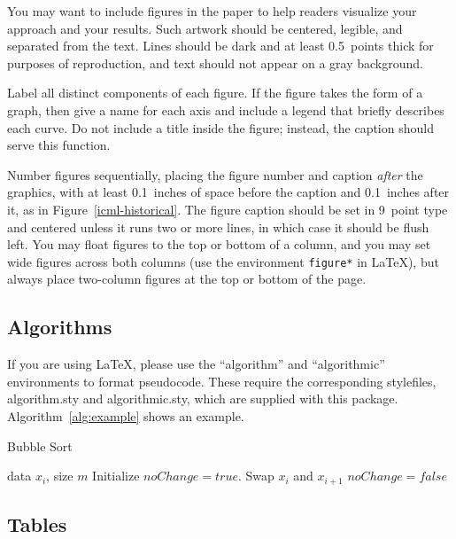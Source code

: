 \documentclass{article}
\begin{document}
You may want to include figures in the paper to help readers visualize
your approach and your results. Such artwork should be centered,
legible, and separated from the text. Lines should be dark and at
least 0.5~points thick for purposes of reproduction, and text should
not appear on a gray background.

Label all distinct components of each figure. If the figure takes the
form of a graph, then give a name for each axis and include a legend
that briefly describes each curve. Do not include a title inside the
figure; instead, the caption should serve this function.

Number figures sequentially, placing the figure number and caption
{\it after\/} the graphics, with at least 0.1~inches of space before
the caption and 0.1~inches after it, as in
Figure~\ref{icml-historical}.  The figure caption should be set in
9~point type and centered unless it runs two or more lines, in which
case it should be flush left.  You may float figures to the top or
bottom of a column, and you may set wide figures across both columns
(use the environment {\tt figure*} in \LaTeX), but always place
two-column figures at the top or bottom of the page.

\subsection{Algorithms}

If you are using \LaTeX, please use the ``algorithm'' and ``algorithmic'' 
environments to format pseudocode. These require 
the corresponding stylefiles, algorithm.sty and 
algorithmic.sty, which are supplied with this package. 
Algorithm~\ref{alg:example} shows an example. 

\begin{algorithm}[tb]
   \caption{Bubble Sort}
   \label{alg:example}
\begin{algorithmic}
    data $x_i$, size $m$
   \REPEAT
   \STATE Initialize $noChange = true$.
   \STATE Swap $x_i$ and $x_{i+1}$
   \STATE $noChange = false$
   \ENDIF
   \ENDFOR
\end{algorithmic}
\end{algorithm}
 
\subsection{Tables} 
 
\end{document}
